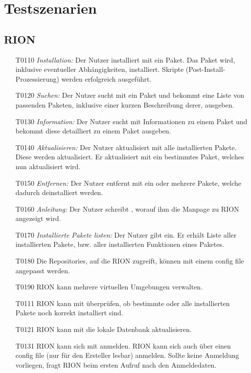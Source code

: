 \chapter{Testszenarien}

\section{RION}

\begin{itemize}
	\item[T0110] \textit{Installation:} Der Nutzer installiert mit  ein Paket. Das Paket wird, inklusive eventueller Abhängigkeiten, installiert. Skripte (Post-Install-Prozessierung) werden erfolgreich ausgeführt.
	\item[T0120] \textit{Suchen:} Der Nutzer sucht mit  ein Paket und bekommt eine Liste von passenden Paketen, inklusive einer kurzen Beschreibung derer, ausgeben.
	\item[T0130] \textit{Information:} Der Nutzer sucht mit  Informationen zu einem Paket und bekommt diese detailliert zu einem Paket ausgeben.
	\item[T0140] \textit{Aktualisieren:} Der Nutzer aktualisiert mit  alle installierten Pakete. Diese werden aktualisiert. Er aktualisiert mit  ein bestimmtes Paket, welches nun aktualisiert wird.
	\item[T0150] \textit{Entfernen:} Der Nutzer entfernt mit  ein oder mehrere Pakete, welche dadurch deinstalliert werden.
	\item[T0160] \textit{Anleitung:} Der Nutzer schreibt , worauf ihm die Manpage zu RION angezeigt wird.
	\item[T0170] \textit{Installierte Pakete listen:} Der Nutzer gibt  ein. Er erhält Liste aller installierten Pakete, bzw. aller installierten Funktionen eines Paketes.
	\item[T0180] Die Repositories, auf die RION zugreift, können mit einem config file angepasst werden.
	\item[T0190] RION kann mehrere virtuellen Umgebungen verwalten.
	\item[T0111] RION kann mit 	 überprüfen, ob bestimmte oder alle installierten Pakete noch korrekt installiert sind.
	\item[T0121] RION kann mit  die lokale Datenbank aktualisieren.
	\item[T0131] RION kann sich mit  anmelden. RION kann sich auch über einen config file (nur für den Ersteller lesbar) anmelden. Sollte keine Anmeldung vorliegen, fragt RION beim ersten Aufruf nach den Anmeldedaten.


\end{itemize}

